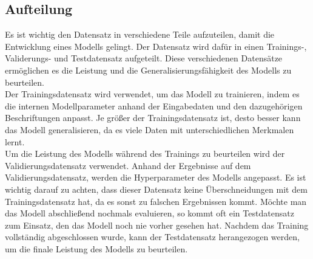 \subsection{Aufteilung}
Es ist wichtig den Datensatz in verschiedene Teile aufzuteilen, damit die Entwicklung eines Modells gelingt. Der Datensatz wird dafür in einen Trainings-, Validerungs- und Testdatensatz aufgeteilt. Diese verschiedenen Datensätze ermöglichen es die Leistung und die Generalisierungsfähigkeit des \gls{Modell}s zu beurteilen. \\
Der Trainingsdatensatz wird verwendet, um das Modell zu trainieren, indem es die internen Modellparameter anhand der Eingabedaten und den dazugehörigen Beschriftungen anpasst. Je größer der Trainingsdatensatz ist, desto besser kann das \gls{Modell} generalisieren, da es viele Daten mit unterschiedlichen Merkmalen lernt. \\
Um die Leistung des \gls{Modell}s während des Trainings zu beurteilen wird der Validierungsdatensatz verwendet. Anhand der Ergebnisse auf dem Validierungsdatensatz, werden die Hyperparameter des \gls{Modell}s angepasst. Es ist wichtig darauf zu achten, dass dieser Datensatz keine Überschneidungen mit dem Trainingsdatensatz hat, da es sonst zu falschen Ergebnissen kommt. \cite[vgl.][]{Weidman2020}
Möchte man das Modell abschließend nochmals evaluieren, so kommt oft ein Testdatensatz zum Einsatz, den das \gls{Modell} noch nie vorher gesehen hat. Nachdem das Training vollständig abgeschlossen wurde, kann der Testdatensatz herangezogen werden, um die finale Leistung des \glspl{Modell} zu beurteilen.